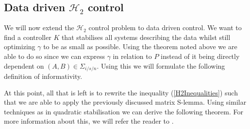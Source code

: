 
\subsection{Data driven $\mathcal{H}_2$ control}
We will now extend the $\mathcal{H}_2$ control problem to data driven control. We want to find a controller $K$ that stabilises all systems describing the data whilst still optimizing $\gamma$ to be as small as possible. Using the theorem noted above we are able to do so since we can express $\gamma$ in relation to $P$ instead of it being directly dependent on $(A,B) \in \Sigma_{i/s/n}$. Using this we will formulate the following definition of informativity.


At this point, all that is left is to rewrite the inequality (\ref{H2Inequalities}) such that we are able to apply the previously discussed matrix S-lemma. Using similar techniques as in quadratic stabilisation we can derive the following theorem. For more information about this, we will refer the reader to \cite[Section V.A]{waarde2020noisy}.



